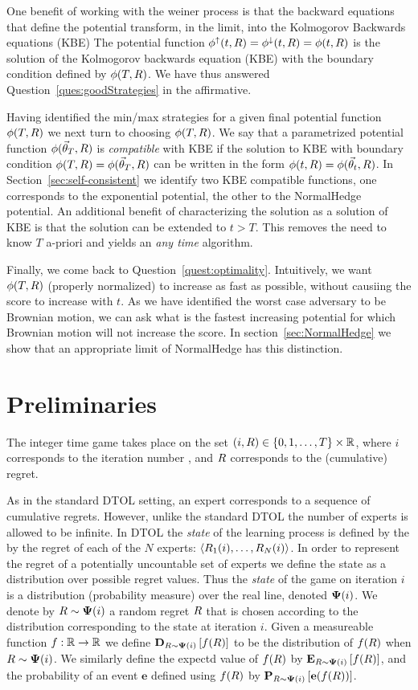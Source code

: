 \documentclass[12pt]{article} %
\begin{document}
One benefit of working with the weiner process is that the backward
equations that define the potential transform, in the limit, into the
Kolmogorov Backwards equations (KBE)
The potential function $\phi^{\uparrow}(t,R) = \phi^{\downarrow}(t,R) = \phi(t,R)$
is the solution of the Kolmogorov backwards equation (KBE) with the
boundary condition defined by $\phi(T,R)$. We have thus
answered Question~\ref{ques:goodStrategies} in the affirmative.

\newcommand{\parvec}{\vec{\theta}}
Having identified the min/max strategies for a given final potential
function $\phi(T,R)$ we next turn to choosing $\phi(T,R)$. We say
that a parametrized potential function $\pot(\parvec_T,\R)$ 
is {\em compatible} with KBE if the solution to KBE with boundary condition
$\pot(T,\R) = \pot(\parvec_T,\R)$ can be written in the form
$\pot(t,\R) = \pot(\parvec_t,\R)$. In
Section~\ref{sec:self-consistent} we identify two KBE compatible
functions, one corresponds to the exponential potential, the other to
the NormalHedge potential. An additional benefit of characterizing the
solution as a solution of KBE is that the solution can be extended to
$t>T$. This removes the need to know $T$ a-priori and yields an {\em
  any time} algorithm.

Finally, we come back to Question~\ref{quest:optimality}. Intuitively,
we want $\phi(T,R)$ (properly normalized) to increase as fast as
possible, without causiing the score to increase with $t$.  As we have
identified the worst case adversary to be Brownian motion, we can ask
what is the fastest increasing potential for which Brownian motion
will not increase the score. In section~\ref{sec:NormalHedge} we show
that an appropriate limit of NormalHedge has this distinction.

\section{Preliminaries} \label{sec:preliminaries}
The integer time game takes place on the set $(i,R) \in \{0,1,\ldots,T\} \times \mathbb{R}$,
where $i$ corresponds to the iteration number ,
and $R$ corresponds to the (cumulative) regret.

As in the standard DTOL setting, an expert corresponds to a sequence
of cumulative regrets. However, unlike the standard DTOL the number
of experts is allowed to be infinite. In DTOL the {\em state}
of the learning process is defined by the by the regret of each of the
$N$ experts: $\langle R_1(i),\ldots,R_N(i) \rangle$. In order to
represent the regret of a potentially uncountable set of experts we
define the state as a distribution over possible regret values.  Thus
the {\em state} of the game on iteration $i$ is a distribution
(probability measure) over the real line, denoted ${\bf \Psi}(i)$.  We
denote by $R \sim {\bf \Psi}(i)$ a random regret $R$ that is chosen
according to the distribution corresponding to the state at iteration
$i$. Given a measureable function $ f:\mathbb{R} \to \mathbb{R}$ we define
${\bf D}_{R\sim {\bf \Psi}(i)}\left[ f(R) \right]$ to be the distribution of $f(R)$ when
$R \sim {\bf \Psi}(i)$. We similarly define the expectd value of $f(R)$
by ${\bf E}_{R\sim {\bf \Psi}(i)}\left[ f(R) \right]$, and the probability of an event
${\mathbf e}$
defined using $f(R)$ by ${\bf P}_{R\sim {\bf \Psi}(i)}\left[ {\mathbf e}(f(R)) \right]$.
\end{document}
